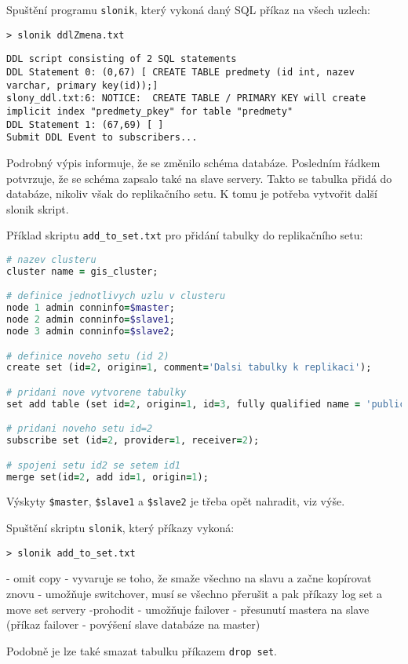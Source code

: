 Spuštění programu \texttt{slonik}, který vykoná daný SQL příkaz na všech uzlech:

\begin{lstlisting}
> slonik ddlZmena.txt
\end{lstlisting}
\begin{lstlisting}[identifierstyle=\color{black},stringstyle=\color{black},keywordstyle=\color{black}]
DDL script consisting of 2 SQL statements
DDL Statement 0: (0,67) [ CREATE TABLE predmety (id int, nazev varchar, primary key(id));]
slony_ddl.txt:6: NOTICE:  CREATE TABLE / PRIMARY KEY will create implicit index "predmety_pkey" for table "predmety"
DDL Statement 1: (67,69) [ ]
Submit DDL Event to subscribers...
\end{lstlisting}

Podrobný výpis informuje, že se změnilo schéma databáze. Posledním řádkem
potvrzuje, že se schéma zapsalo také na slave servery. Takto se tabulka přidá do
databáze, nikoliv však do replikačního setu. K tomu je potřeba vytvořit
další slonik skript.

Příklad skriptu \texttt{add\_to\_set.txt} pro přidání tabulky do replikačního
setu:

\begin{lstlisting}[language=ruby]
# nazev clusteru
cluster name = gis_cluster;

# definice jednotlivych uzlu v clusteru
node 1 admin conninfo=$master;
node 2 admin conninfo=$slave1;
node 3 admin conninfo=$slave2;

# definice noveho setu (id 2)
create set (id=2, origin=1, comment='Dalsi tabulky k replikaci');

# pridani nove vytvorene tabulky
set add table (set id=2, origin=1, id=3, fully qualified name = 'public.predmet', comment='seznam predmetu');

# pridani noveho setu id=2
subscribe set (id=2, provider=1, receiver=2);

# spojeni setu id2 se setem id1
merge set(id=2, add id=1, origin=1);
\end{lstlisting}
Výskyty \texttt{\$master}, \texttt{\$slave1} a \texttt{\$slave2} je třeba opět
nahradit, viz výše.

Spuštění skriptu \texttt{slonik}, který příkazy vykoná:

\begin{lstlisting}
> slonik add_to_set.txt
\end{lstlisting}


- omit copy - vyvaruje se toho, že smaže všechno na slavu a začne kopírovat znovu
- umožňuje switchover, musí se všechno přerušit a pak příkazy log set a move set servery -prohodit
- umožňuje failover - přesunutí mastera na slave (příkaz failover - povýšení slave databáze na master)

Podobně je lze také smazat tabulku příkazem \texttt{drop set}. 
